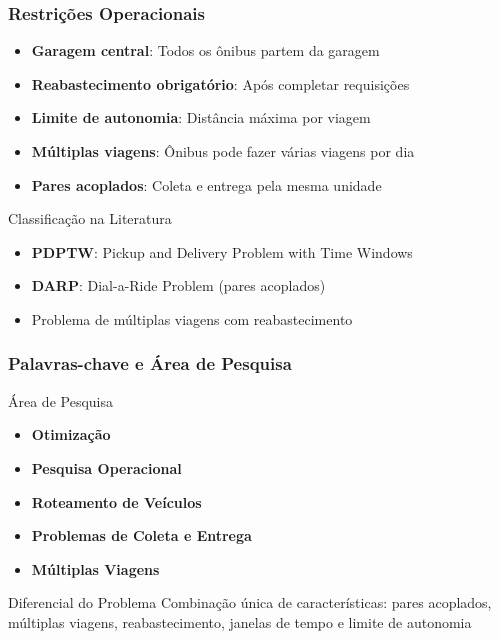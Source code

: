 \documentclass[10pt]{beamer}
\begin{document}
\begin{frame}
\frametitle{Restrições Operacionais}
\begin{itemize}
    \item \textbf{Garagem central}: Todos os ônibus partem da garagem
    \item \textbf{Reabastecimento obrigatório}: Após completar requisições
    \item \textbf{Limite de autonomia}: Distância máxima por viagem
    \item \textbf{Múltiplas viagens}: Ônibus pode fazer várias viagens por dia
    \item \textbf{Pares acoplados}: Coleta e entrega pela mesma unidade
\end{itemize}

\vspace{0.5cm}
\begin{block}{Classificação na Literatura}
\begin{itemize}
    \item \textbf{PDPTW}: Pickup and Delivery Problem with Time Windows
    \item \textbf{DARP}: Dial-a-Ride Problem (pares acoplados)
    \item Problema de múltiplas viagens com reabastecimento
\end{itemize}
\end{block}
\end{frame}

\begin{frame}
\frametitle{Palavras-chave e Área de Pesquisa}
\begin{block}{Área de Pesquisa}
\begin{itemize}
    \item \textbf{Otimização}
    \item \textbf{Pesquisa Operacional}
    \item \textbf{Roteamento de Veículos}
    \item \textbf{Problemas de Coleta e Entrega}
    \item \textbf{Múltiplas Viagens}
\end{itemize}
\end{block}

\begin{alertblock}{Diferencial do Problema}
Combinação única de características: pares acoplados, múltiplas viagens, 
reabastecimento, janelas de tempo e limite de autonomia
\end{alertblock}
\end{frame}
\end{document}
